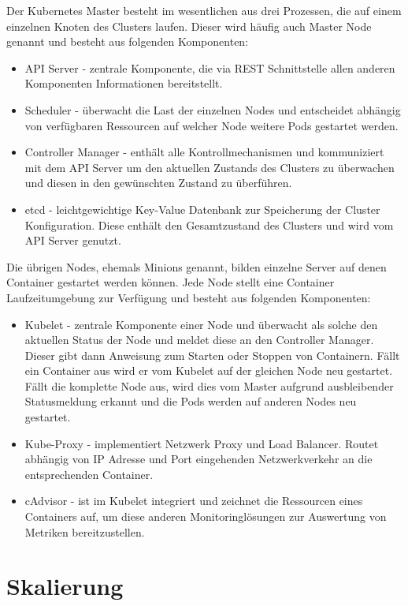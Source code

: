 Der Kubernetes Master besteht im wesentlichen aus drei Prozessen, die auf einem einzelnen Knoten des Clusters laufen. Dieser wird häufig auch Master Node genannt und besteht aus folgenden Komponenten:
\begin{itemize}
	\item API Server - zentrale Komponente, die via REST Schnittstelle allen anderen Komponenten Informationen bereitstellt.
	\item Scheduler - überwacht die Last der einzelnen Nodes und entscheidet abhängig von verfügbaren Ressourcen auf welcher Node weitere Pods gestartet werden.
	\item Controller Manager - enthält alle Kontrollmechanismen und kommuniziert mit dem API Server um den aktuellen Zustands des Clusters zu überwachen und diesen in den gewünschten Zustand zu überführen.
	\item etcd - leichtgewichtige Key-Value Datenbank zur Speicherung der Cluster Konfiguration. Diese enthält den Gesamtzustand des Clusters und wird vom API Server genutzt.
\end{itemize}\newpage

Die übrigen Nodes, ehemals Minions genannt, bilden einzelne Server auf denen Container gestartet werden können.
Jede Node stellt eine Container Laufzeitumgebung zur Verfügung und besteht aus folgenden Komponenten:

\begin{itemize}
	\item Kubelet - zentrale Komponente einer Node und überwacht als solche den aktuellen Status der Node und meldet diese an den Controller Manager. Dieser gibt dann Anweisung zum Starten oder Stoppen von Containern. Fällt ein Container aus wird er vom Kubelet auf der gleichen Node neu gestartet. Fällt die komplette Node aus, wird dies vom Master aufgrund ausbleibender Statusmeldung erkannt und die Pods werden auf anderen Nodes neu gestartet.
	\item Kube-Proxy - implementiert Netzwerk Proxy und Load Balancer. Routet abhängig von IP Adresse und Port eingehenden Netzwerkverkehr an die entsprechenden Container.
	\item cAdvisor - ist im Kubelet integriert und zeichnet die Ressourcen eines Containers auf, um diese anderen Monitoringlösungen zur Auswertung von Metriken bereitzustellen.
\end{itemize}

\newpage

\section{Skalierung}

